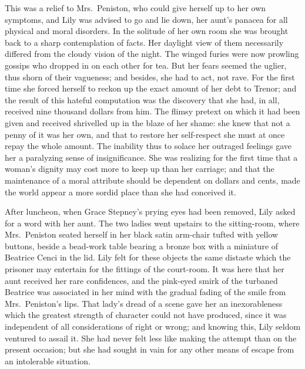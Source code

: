 \documentclass[12pt,a4paper]{book}
\begin{document}
This was a relief to Mrs.\ Peniston, who could give herself up to
her own symptoms, and Lily was advised to go and lie down, her
aunt's panacea for all physical and moral disorders. In the
solitude of her own room she was brought back to a sharp
contemplation of facts. Her daylight view of them necessarily
differed from the cloudy vision of the night. The winged furies
were now prowling gossips who dropped in on each other for tea. 
But her fears seemed the uglier, thus shorn of their vagueness;
and besides, she had to act, not rave. For the first time she
forced herself to reckon up the exact amount of her debt to
Trenor; and the result of this hateful computation was the
discovery that she had, in all, received nine thousand dollars
from him. The flimsy pretext on which it had been given and
received shrivelled up in the blaze of her shame: she knew that
not a penny of it was her own, and that to restore her
self-respect she must at once repay the whole amount. The
inability thus to solace her outraged feelings gave her a
paralyzing sense of insignificance. She was realizing for the
first time that a woman's dignity may cost more to keep up than
her carriage; and that the maintenance of a moral
attribute should be dependent on dollars and cents, made the
world appear a more sordid place than she had conceived it.





After luncheon, when Grace Stepney's prying eyes had been
removed, Lily asked for a word with her aunt. The two ladies went
upstairs to the sitting-room, where Mrs.\ Peniston seated herself
in her black satin arm-chair tufted with yellow buttons, beside a
bead-work table bearing a bronze box with a miniature of Beatrice
Cenci in the lid. Lily felt for these objects the same distaste
which the prisoner may entertain for the fittings of the
court-room. It was here that her aunt received her rare
confidences, and the pink-eyed smirk of the turbaned Beatrice was
associated in her mind with the gradual fading of the smile from
Mrs.\ Peniston's lips. That lady's dread of a scene gave her an
inexorableness which the greatest strength of character could not
have produced, since it was independent of all considerations of
right or wrong; and knowing this, Lily seldom ventured to assail
it. She had never felt less like making the attempt than on the
present occasion; but she had sought in vain for any other means
of escape from an intolerable situation.
\end{document}
